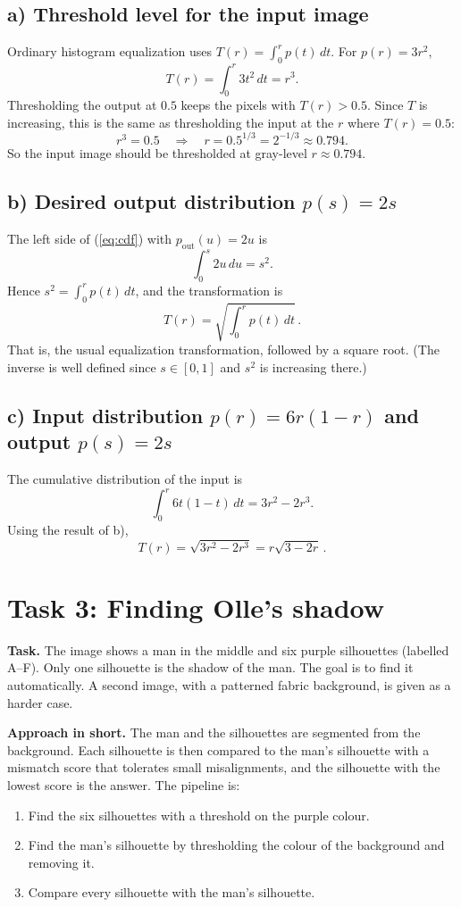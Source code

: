 \documentclass[11pt,a4paper]{article}
\begin{document}
\subsection*{a) Threshold level for the input image}

Ordinary histogram equalization uses $T(r)=\int_0^r p(t)\,dt$. For $p(r)=3r^2$,
\[
    T(r) = \int_0^r 3t^2\,dt = r^3 .
\]
Thresholding the output at $0.5$ keeps the pixels with $T(r) > 0.5$. Since $T$ is increasing, this is the same as thresholding the input at the $r$ where $T(r)=0.5$:
\[
    r^3 = 0.5 \quad\Longrightarrow\quad r = 0.5^{1/3} = 2^{-1/3} \approx 0.794 .
\]
So the input image should be thresholded at gray-level $r \approx 0.794$.

\subsection*{b) Desired output distribution $p(s)=2s$}

The left side of (\ref{eq:cdf}) with $p_{\text{out}}(u)=2u$ is
\[
    \int_0^s 2u\,du = s^2 .
\]
Hence $s^2 = \int_0^r p(t)\,dt$, and the transformation is
\[
    T(r) = \sqrt{\int_0^r p(t)\,dt}\, .
\]
That is, the usual equalization transformation, followed by a square root. (The inverse is well defined since $s \in [0,1]$ and $s^2$ is increasing there.)

\subsection*{c) Input distribution $p(r)=6r(1-r)$ and output $p(s)=2s$}

The cumulative distribution of the input is
\[
    \int_0^r 6t(1-t)\,dt = 3r^2 - 2r^3 .
\]
Using the result of b),
\[
    T(r) = \sqrt{3r^2 - 2r^3} = r\sqrt{3-2r}\, .
\]

\section{Task 3: Finding Olle's shadow}

\textbf{Task.} The image shows a man in the middle and six purple silhouettes (labelled A--F). Only one silhouette is the shadow of the man. The goal is to find it automatically. A second image, with a patterned fabric background, is given as a harder case.

\textbf{Approach in short.} The man and the silhouettes are segmented from the background. Each silhouette is then compared to the man's silhouette with a mismatch score that tolerates small misalignments, and the silhouette with the lowest score is the answer. The pipeline is:
\begin{enumerate}
    \item Find the six silhouettes with a threshold on the purple colour.
    \item Find the man's silhouette by thresholding the colour of the background and removing it.
    \item Compare every silhouette with the man's silhouette.
\end{enumerate}
\end{document}
